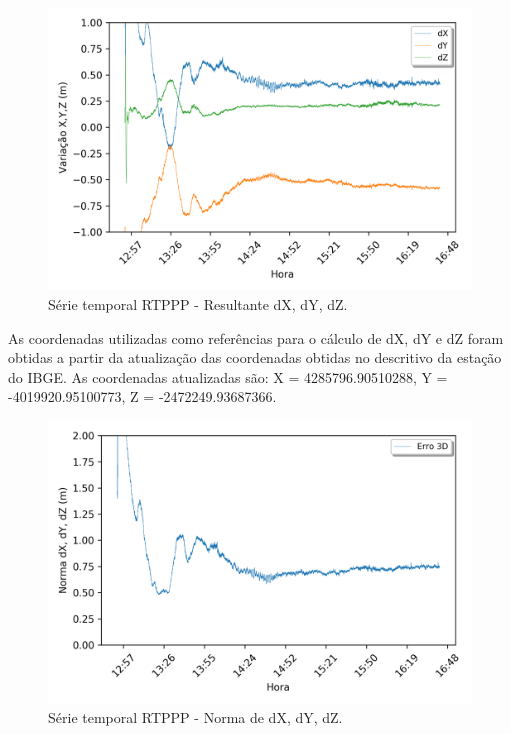 \begin{figure}[H]
\centering
\includegraphics[scale=0.9]{data/Graphics/RJ_T20712/RJ_T20712_graphic_xyz.png}
\caption{Série temporal RTPPP - Resultante dX, dY, dZ.}
\label{}
\end{figure}

As coordenadas utilizadas como referências para o cálculo de dX, dY e dZ foram obtidas a partir da atualização das coordenadas obtidas no descritivo da estação do IBGE. As coordenadas atualizadas são: X = 4285796.90510288, Y = -4019920.95100773, Z = -2472249.93687366.

\begin{figure}[H]
\centering
\includegraphics[scale=0.9]{data/Graphics/RJ_T20712/RJ_T20712_graphic_result.png}
\caption{Série temporal RTPPP - Norma de dX, dY, dZ.}
\label{result_20712}
\end{figure}

